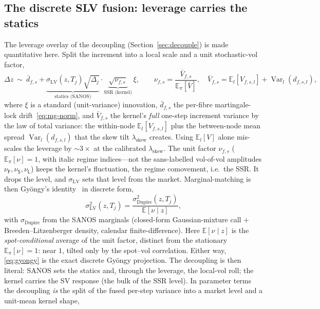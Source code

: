 \documentclass[11pt]{article}
\newcommand{\E}{\mathbb{E}}
\newcommand{\Var}{\operatorname{Var}}
\begin{document}
\subsection{The discrete SLV fusion: leverage carries the statics}
\label{sec:fusion}
The leverage overlay of the decoupling (Section~\ref{sec:decouple}) is made quantitative here. Split
the increment into a local scale and a unit stochastic-vol factor,
\begin{equation}
\Delta z\ \sim\ \bar d_{f,s}+\underbrace{\sigma_{\mathrm{LV}}(z,T_j)\sqrt{\Delta_j}}
  _{\text{statics (SANOS)}}\cdot\underbrace{\sqrt{\nu_{f,s}}}_{\text{SSR (kernel)}}\,\xi,
\qquad
\nu_{f,s}=\frac{\bar V_{f,s}}{\E_\pi[\bar V]},\quad
\bar V_{f,s}=\E_l[V_{f,s,l}]+\Var_l(d_{f,s,l}),
\end{equation}
where $\xi$ is a standard (unit-variance) innovation, $\bar d_{f,s}$ the per-fibre
martingale-lock drift~\eqref{eq:mg-norm}, and $\bar V_{f,s}$ the kernel's \emph{full} one-step increment
variance by the law of total variance: the within-node $\E_l[V_{f,s,l}]$ plus the between-node
mean spread $\Var_l(d_{f,s,l})$ that the skew tilt $\lambda_{\mathrm{skew}}$ creates. Using
$\E_l[V]$ alone mis-scales the leverage by $\sim 3\times$ at the calibrated
$\lambda_{\mathrm{skew}}$. The unit factor
$\nu_{f,s}$ ($\E_\pi[\nu]=1$, with italic regime indices---not the sans-labelled vol-of-vol
amplitudes $\nu_{\mathsf F},\nu_{\mathsf S},\nu_{\mathsf L}$) keeps the kernel's fluctuation,
the regime comovement, i.e.\ the SSR. It drops the level, and $\sigma_{\mathrm{LV}}$ sets that
level from the market.
Marginal-matching is then Gy\"ongy's identity~\cite{gyongy1986} in discrete form,
\begin{equation}
\sigma_{\mathrm{LV}}^2(z,T_j)=\frac{\sigma_{\mathrm{Dupire}}^2(z,T_j)}{\E[\nu\mid z]},
\label{eq:gyongy}
\end{equation}
with $\sigma_{\mathrm{Dupire}}$ from the SANOS marginals (closed-form Gaussian-mixture
call $+$ Breeden--Litzenberger density, calendar finite-difference). Here $\E[\nu\mid z]$ is the
\emph{spot-conditional} average of the unit factor, distinct from the stationary
$\E_\pi[\nu]=1$: near $1$, tilted only by the spot--vol correlation. Either way,
\eqref{eq:gyongy} is the exact discrete Gy\"ongy projection. The decoupling is then literal: SANOS sets the statics and, through the
leverage, the local-vol roll; the kernel carries the SV response (the bulk of the SSR
level). In parameter terms the decoupling \emph{is} the split of the fused per-step variance into a
market level and a unit-mean kernel shape,
\end{document}
